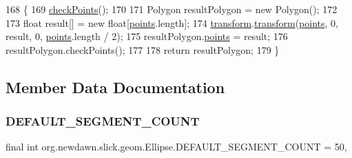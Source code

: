 \begin{DoxyCode}
168                                                 \{
169         \mbox{\hyperlink{classorg_1_1newdawn_1_1slick_1_1geom_1_1_shape_a84293802d05e8666a441720bfc12745d}{checkPoints}}();
170         
171         Polygon resultPolygon = \textcolor{keyword}{new} Polygon();
172         
173         \textcolor{keywordtype}{float} result[] = \textcolor{keyword}{new} \textcolor{keywordtype}{float}[\mbox{\hyperlink{classorg_1_1newdawn_1_1slick_1_1geom_1_1_shape_a8b4d4058734bbb3b96072e470b92aa37}{points}}.length];
174         \mbox{\hyperlink{classorg_1_1newdawn_1_1slick_1_1geom_1_1_ellipse_a100ff1837af22a13088dd9b93cc898ab}{transform}}.\mbox{\hyperlink{classorg_1_1newdawn_1_1slick_1_1geom_1_1_shape_a463826a085479c379e40f012e970b997}{transform}}(\mbox{\hyperlink{classorg_1_1newdawn_1_1slick_1_1geom_1_1_shape_a8b4d4058734bbb3b96072e470b92aa37}{points}}, 0, result, 0, \mbox{\hyperlink{classorg_1_1newdawn_1_1slick_1_1geom_1_1_shape_a8b4d4058734bbb3b96072e470b92aa37}{points}}.length / 2);
175         resultPolygon.\mbox{\hyperlink{classorg_1_1newdawn_1_1slick_1_1geom_1_1_shape_a8b4d4058734bbb3b96072e470b92aa37}{points}} = result;
176         resultPolygon.checkPoints();
177 
178         \textcolor{keywordflow}{return} resultPolygon;
179     \}
\end{DoxyCode}


\subsection{Member Data Documentation}
\mbox{\label{classorg_1_1newdawn_1_1slick_1_1geom_1_1_ellipse_ab54d98cffdafc585874107a2d55c8fdb}} 
\subsubsection{\texorpdfstring{D\+E\+F\+A\+U\+L\+T\+\_\+\+S\+E\+G\+M\+E\+N\+T\+\_\+\+C\+O\+U\+NT}{DEFAULT\_SEGMENT\_COUNT}}
{\footnotesize\ttfamily final int org.\+newdawn.\+slick.\+geom.\+Ellipse.\+D\+E\+F\+A\+U\+L\+T\+\_\+\+S\+E\+G\+M\+E\+N\+T\+\_\+\+C\+O\+U\+NT = 50\hspace{0.3cm}{\ttfamily [static]}, {\ttfamily [protected]}}

